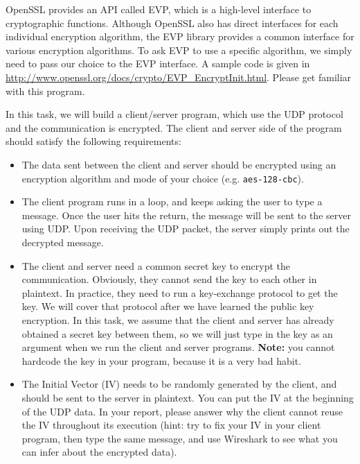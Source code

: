 OpenSSL provides an API called EVP, which
is a high-level interface to cryptographic functions.
Although OpenSSL also has direct interfaces for each individual
encryption algorithm, the EVP library provides
a common interface for various encryption algorithms.
To ask EVP to use a specific algorithm, we simply need to
pass our choice to the EVP interface.
A sample code is given in
\url{http://www.openssl.org/docs/crypto/EVP_EncryptInit.html}.
Please get familiar with this program.


In this task, we will build a client/server program, which use the UDP protocol and
the communication is encrypted. The client and server side of the program should
satisfy the following requirements:

\begin{itemize}
  \item The data sent between the client and server should be encrypted using
    an encryption algorithm and mode of your choice (e.g. \texttt{aes-128-cbc}).

  \item The client program runs in a loop, and keeps asking the user to type a message.
    Once the user hits the return, the message will be sent to the server using UDP.
    Upon receiving the UDP packet, the server simply prints out the decrypted message.

  \item The client and server need a common secret key to encrypt the communication.
    Obviously, they cannot send the key to each other in plaintext. In practice, they
    need to run a key-exchange protocol to get the key. We will cover that protocol
    after we have learned the public key encryption. In this task, we assume that the client
    and server has already obtained a secret key between them, so we will just
    type in the key as an argument when we run the client and server programs.
    {\bf Note:} you cannot hardcode the key in your program, because it is a very bad habit.

  \item The Initial Vector (IV) needs to be randomly generated by the client,
    and should be sent to the server in plaintext. You can put the IV at the beginning of the
    UDP data. In your report, please answer why the client cannot reuse the IV throughout its
    execution (hint: try to fix your IV in your client program, then type the same message, and
    use Wireshark to see what you can infer about the encrypted data).
\end{itemize}
